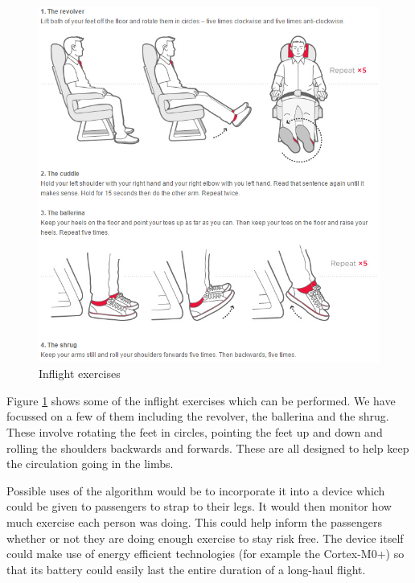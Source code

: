 \begin{figure}[h]
  \centering
    \includegraphics[width=1.0\textwidth]{figures/exercises}
  \caption{Inflight exercises \cite{virgin2015exercises}}
  \label{fig:exercises}
\end{figure}

Figure \ref{fig:exercises} shows some of the inflight exercises which can be performed. We have focussed on a few of them including the revolver, the ballerina and the shrug. These involve rotating the feet in circles, pointing the feet up and down and rolling the shoulders backwards and forwards. These are all designed to help keep the circulation going in the limbs.

Possible uses of the algorithm would be to incorporate it into a device which could be given to passengers to strap to their legs. It would then monitor how much exercise each person was doing. This could help inform the passengers whether or not they are doing enough exercise to stay risk free. The device itself could make use of energy efficient technologies (for example the Cortex-M0+) so that its battery could easily last the entire duration of a long-haul flight.



